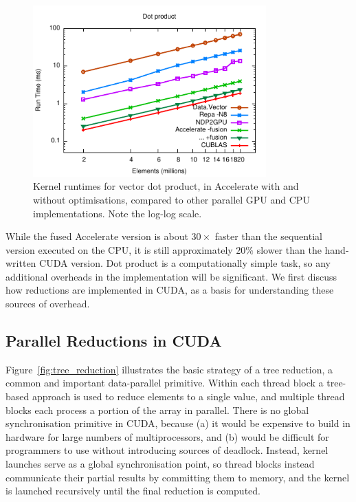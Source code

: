 \begin{figure}[htbp]
    \begin{center}
        \includegraphics[width=0.8\textwidth]{images/sec-6/dotp/dotp}
    \end{center}
    \caption[Vector dot product kernel benchmarks]{Kernel runtimes for vector
        dot product, in Accelerate with and without optimisations, compared to
        other parallel GPU and CPU implementations. Note the log-log scale.}
    \label{fig:dotp}
\end{figure}

While the fused Accelerate version is about $30\times$ faster than the
sequential version executed on the CPU, it is still approximately $20\%$ slower
than the hand-written CUDA version. Dot product is a computationally simple
task, so any additional overheads in the implementation will be significant.
We first discuss how reductions are implemented in CUDA, as a basis for
understanding these sources of overhead.


\subsection{Parallel Reductions in CUDA}
\label{sec:parallel_reduction}


Figure~\ref{fig:tree_reduction} illustrates the basic strategy of a tree
reduction, a common and important data-parallel primitive. Within each thread
block a tree-based approach is used to reduce elements to a single value, and
multiple thread blocks each process a portion of the array in parallel. There is
no global synchronisation primitive in CUDA, because (a) it would be expensive
to build in hardware for large numbers of multiprocessors, and (b) would be
difficult for programmers to use without introducing sources of deadlock.
Instead, kernel launches serve as a global synchronisation point, so thread
blocks instead communicate their partial results by committing them to memory,
and the kernel is launched recursively until the final reduction is computed.

